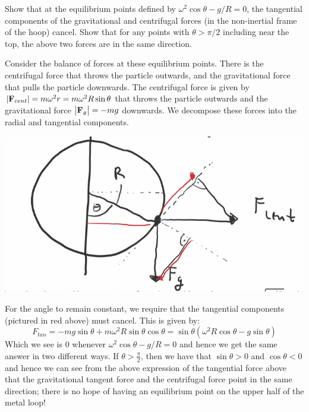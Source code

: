 \documentclass[../PHYS306Notes.tex]{subfiles}
\begin{document}
\begin{p}
Show that at the equilibrium points defined by $\omega^2\cos\theta - g/R = 0$, the tangential components of the gravitational and centrifugal forces (in the non-inertial frame of the hoop) cancel. Show that for any points with $\theta > \pi/2$ including near the top, the above two forces are in the same direction.
\end{p}
\begin{s}
Consider the balance of forces at these equilibrium points. There is the centrifugal force that throws the particle outwards, and the gravitational force that pulls the particle downwards. The centrifugal force is given by $\abs{\mathbf{F}_{cent}} = m\omega^2r = m\omega^2R\sin\theta$ that throws the particle outwards and the gravitational force $\abs{\mathbf{F}_g}= -mg$ downwards. We decompose these forces into the radial and tangential components.
\begin{center}
    \includegraphics[scale=0.4]{Lecture-5/W5-img3.png}
\end{center}
For the angle to remain constant, we require that the tangential components (pictured in red above) must cancel. This is given by:
\[F_{tan} = -mg\sin\theta + m\omega^2R\sin\theta\cos\theta = \sin\theta\left(\omega^2 R\cos\theta - g\sin\theta\right)\]
Which we see is $0$ whenever $\omega^2\cos\theta - g/R = 0$ and hence we get the same answer in two different ways. 
If $\theta > \frac{\pi}{2}$, then we have that $\sin\theta > 0$ and $\cos\theta < 0$ and hence we can see from the above expression of the tangential force above that the gravitational tangent force and the centrifugal force point in the same direction; there is no hope of having an equilibrium point on the upper half of the metal loop!
\end{s}
\end{document}
